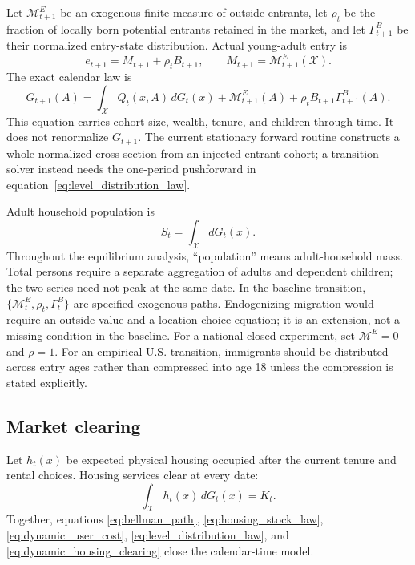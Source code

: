 \documentclass[11pt]{article}
\theoremstyle{definition}
\newcommand{\1}{\mathbf 1}
\newcommand{\X}{\mathcal X}
\begin{document}
Let $\mathcal M^E_{t+1}$ be an exogenous finite measure of outside entrants,
let $\rho_t$ be the fraction of locally born potential entrants retained in
the market, and let $\Gamma^B_{t+1}$ be their normalized entry-state
distribution. Actual young-adult entry is
\begin{equation}
 e_{t+1}=M_{t+1}+\rho_tB_{t+1},
 \qquad M_{t+1}=\mathcal M^E_{t+1}(\X).
 \label{eq:actual_entry}
\end{equation}
The exact calendar law is
\begin{equation}
 G_{t+1}(A)=
 \int_{\X}Q_t(x,A)\,dG_t(x)
 +\mathcal M^E_{t+1}(A)
 +\rho_tB_{t+1}\Gamma^B_{t+1}(A).
 \label{eq:level_distribution_law}
\end{equation}
This equation carries cohort size, wealth, tenure, and children through time.
It does not renormalize $G_{t+1}$. The current stationary forward routine
constructs a whole normalized cross-section from an injected entrant cohort;
a transition solver instead needs the one-period pushforward in
equation~\eqref{eq:level_distribution_law}.

Adult household population is
\begin{equation}
 S_t=\int_{\X}dG_t(x).
 \label{eq:population_and_births}
\end{equation}
Throughout the equilibrium analysis, ``population'' means adult-household
mass. Total persons require a separate aggregation of adults and dependent
children; the two series need not peak at the same date.
In the baseline transition, $\{\mathcal M^E_t,\rho_t,\Gamma^B_t\}$ are
specified exogenous paths. Endogenizing migration would require an outside
value and a location-choice equation; it is an extension, not a missing
condition in the baseline. For a national closed experiment, set
$\mathcal M^E=0$ and $\rho=1$. For an
empirical U.S. transition, immigrants should be distributed across entry ages
rather than compressed into age 18 unless the compression is stated
explicitly.

\subsection{Market clearing}

Let $h_t(x)$ be expected physical housing occupied after the current tenure
and rental choices. Housing services clear at every date:
\begin{equation}
 \int_{\X}h_t(x)\,dG_t(x)=K_t.
 \label{eq:dynamic_housing_clearing}
\end{equation}
Together, equations \eqref{eq:bellman_path},
\eqref{eq:housing_stock_law}, \eqref{eq:dynamic_user_cost},
\eqref{eq:level_distribution_law}, and \eqref{eq:dynamic_housing_clearing}
close the calendar-time model.
\end{document}
